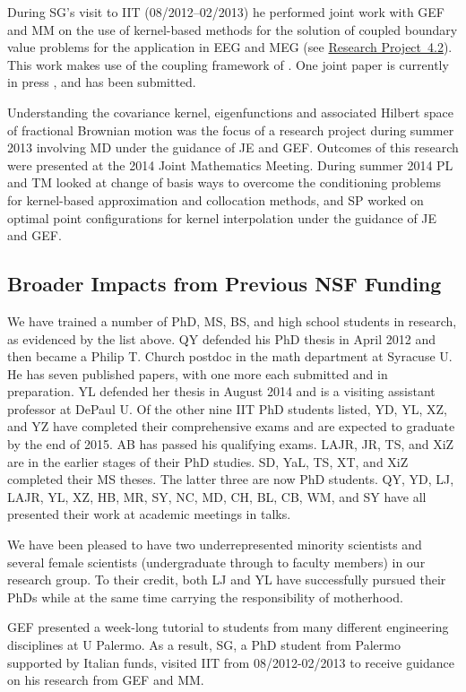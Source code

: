 \documentclass[11pt]{NSFamsart}
\newcommand{\refprobdb}{\hyperref[SectMEEG]{Research Project~4.2}\xspace}
\begin{document}
During SG's visit to IIT (08/2012--02/2013) he performed joint work with GEF and MM on the use of kernel-based methods for the solution of coupled boundary value problems for the application in EEG and MEG (see \refprobdb). This work makes use of the coupling framework of \cite{McCF14}. One joint paper is currently in press \citep{AFFGM15}, and \citep{AFFGM13} has been submitted.

Understanding the covariance kernel, eigenfunctions and associated Hilbert space of fractional Brownian motion was the focus of a research project during summer 2013 involving MD under the guidance of JE and GEF. Outcomes of this research were presented at the 2014 Joint Mathematics Meeting. During summer 2014 PL and TM looked at change of basis ways to overcome
the conditioning problems for kernel-based approximation
and collocation methods, and SP worked on optimal point configurations for kernel
interpolation under the guidance of JE and GEF.

\subsection{Broader Impacts from Previous NSF Funding}

We have trained a number of PhD, MS, BS, and high school students in research, as evidenced by the list above.  QY defended his PhD thesis in April 2012 and then became a Philip T. Church postdoc in the math department at Syracuse U. He has seven published papers, with one more each submitted and in preparation.  YL defended her thesis in August 2014 and is a visiting assistant professor at DePaul U.  Of the other nine IIT PhD students listed, YD, YL, XZ, and YZ have completed their comprehensive exams and are expected to graduate by the end of 2015.  AB has passed his qualifying exams.  LAJR, JR, TS, and XiZ are in the earlier stages of their PhD studies. SD, YaL, TS, XT, and XiZ completed their MS theses. The latter three are now PhD students.  QY, YD, LJ, LAJR, YL, XZ, HB, MR, SY, NC, MD, CH, BL, CB, WM, and SY have all presented their work at academic meetings in talks.

We have been pleased to have two underrepresented minority scientists and several female scientists (undergraduate through to faculty members) in our research group.  To their credit, both LJ and YL have successfully pursued their PhDs while at the same time carrying the responsibility of motherhood.

GEF presented a week-long tutorial to students from many different engineering disciplines at U Palermo. As a result, SG, a PhD student from Palermo supported by Italian funds, visited IIT from 08/2012-02/2013 to receive guidance on his research from GEF and MM.
\end{document}

